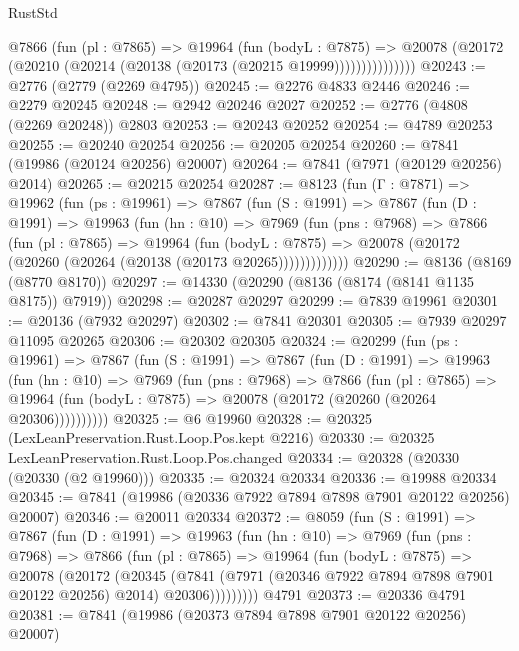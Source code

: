 \begin{lexlean}{RustStd}
\begin{coremodule}
                @7866
                  (fun (pl : @7865) =>
                  @19964
                    (fun (bodyL : @7875) =>
                    @20078 (@20172 (@20210 (@20214 (@20138 (@20173 (@20215 @19999)))))))))))))))
@20243 := @2776 (@2779 (@2269 @4795))
@20245 := @2276 @4833 @2446
@20246 := @2279 @20245
@20248 := @2942 @20246 @2027
@20252 := @2776 (@4808 (@2269 @20248)) @2803
@20253 := @20243 @20252
@20254 := @4789 @20253
@20255 := @20240 @20254
@20256 := @20205 @20254
@20260 := @7841 (@19986 (@20124 @20256) @20007)
@20264 := @7841 (@7971 (@20129 @20256) @2014)
@20265 := @20215 @20254
@20287 := @8123
    (fun (Γ : @7871) =>
    @19962
      (fun (ps : @19961) =>
      @7867
        (fun (S : @1991) =>
        @7867
          (fun (D : @1991) =>
          @19963
            (fun (hn : @10) =>
            @7969
              (fun (pns : @7968) =>
              @7866
                (fun (pl : @7865) =>
                @19964
                  (fun (bodyL : @7875) =>
                  @20078 (@20172 (@20260 (@20264 (@20138 (@20173 @20265)))))))))))))
@20290 := @8136 (@8169 (@8770 @8170))
@20297 := @14330 (@20290 (@8136 (@8174 (@8141 @1135 @8175)) @7919))
@20298 := @20287 @20297
@20299 := @7839 @19961
@20301 := @20136 (@7932 @20297)
@20302 := @7841 @20301
@20305 := @7939 @20297 @11095 @20265
@20306 := @20302 @20305
@20324 := @20299
    (fun (ps : @19961) =>
    @7867
      (fun (S : @1991) =>
      @7867
        (fun (D : @1991) =>
        @19963
          (fun (hn : @10) =>
          @7969
            (fun (pns : @7968) =>
            @7866
              (fun (pl : @7865) =>
              @19964 (fun (bodyL : @7875) => @20078 (@20172 (@20260 (@20264 @20306))))))))))
@20325 := @6 @19960
@20328 := @20325 (LexLeanPreservation.Rust.Loop.Pos.kept @2216)
@20330 := @20325 LexLeanPreservation.Rust.Loop.Pos.changed
@20334 := @20328 (@20330 (@20330 (@2 @19960)))
@20335 := @20324 @20334
@20336 := @19988 @20334
@20345 := @7841 (@19986 (@20336 @7922 @7894 @7898 @7901 @20122 @20256) @20007)
@20346 := @20011 @20334
@20372 := @8059
    (fun (S : @1991) =>
    @7867
      (fun (D : @1991) =>
      @19963
        (fun (hn : @10) =>
        @7969
          (fun (pns : @7968) =>
          @7866
            (fun (pl : @7865) =>
            @19964
              (fun (bodyL : @7875) =>
              @20078
                (@20172
                  (@20345
                    (@7841
                      (@7971 (@20346 @7922 @7894 @7898 @7901 @20122 @20256) @2014)
                      @20306)))))))))
    @4791
@20373 := @20336 @4791
@20381 := @7841 (@19986 (@20373 @7894 @7898 @7901 @20122 @20256) @20007)

\end{coremodule}
\end{lexlean}
